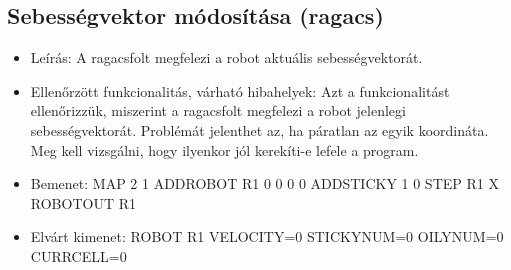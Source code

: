 \subsection{Sebességvektor módosítása (ragacs)}
\begin{itemize}
	\item Leírás: \newline
	A ragacsfolt megfelezi a robot aktuális sebességvektorát.
	\item Ellenőrzött funkcionalitás, várható hibahelyek: \newline 
	Azt a funkcionalitást ellenőrizzük, miszerint a ragacsfolt megfelezi a robot jelenlegi sebességvektorát. Problémát jelenthet az, ha páratlan az egyik koordináta. Meg kell vizsgálni, hogy ilyenkor jól kerekíti-e lefele a program.
	
	\item Bemenet: \newline
		MAP 2 1 \newline
		ADDROBOT R1 0 0 0 0 \newline
		ADDSTICKY 1 0 \newline
		STEP R1 X \newline
		ROBOTOUT R1 \newline
		
	\item Elvárt kimenet: \newline
	ROBOT R1 VELOCITY=0 STICKYNUM=0 OILYNUM=0 CURRCELL=0 \newline
	
\end{itemize}

